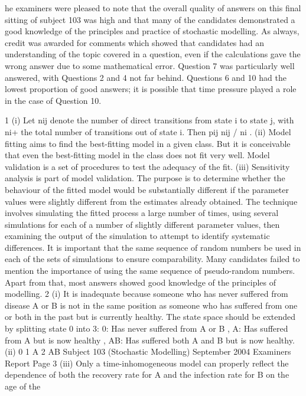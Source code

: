 \documentclass[a4paper,12pt]{article}
\begin{document}
\newpage
he examiners were pleased to note that the overall quality of answers on this
final sitting of subject 103 was high and that many of the candidates
demonstrated a good knowledge of the principles and practice of stochastic modelling. As always, credit was awarded for comments which showed that candidates had an understanding of the topic covered in a question, even if the
calculations gave the wrong answer due to some mathematical error.
Question 7 was particularly well answered, with Questions 2 and 4 not far
behind. Questions 6 and 10 had the lowest proportion of good answers; it is
possible that time pressure played a role in the case of Question 10.

1 (i) Let nij denote the number of direct transitions from state i to state j, with ni+
the total number of transitions out of state i. Then pij nij / ni .
(ii) Model fitting aims to find the best-fitting model in a given class. But it is
conceivable that even the best-fitting model in the class does not fit very well.
Model validation is a set of procedures to test the adequacy of the fit.
(iii) Sensitivity analysis is part of model validation. The purpose is to determine
whether the behaviour of the fitted model would be substantially different if
the parameter values were slightly different from the estimates already
obtained.
The technique involves simulating the fitted process a large number of times,
using several simulations for each of a number of slightly different parameter
values, then examining the output of the simulation to attempt to identify
systematic differences.
It is important that the same sequence of random numbers be used in each of
the sets of simulations to ensure comparability.
Many candidates failed to mention the importance of using the same sequence
of pseudo-random numbers. Apart from that, most answers showed good
knowledge of the principles of modelling.
2 (i) It is inadequate because someone who has never suffered from disease A or B
is not in the same position as someone who has suffered from one or both in
the past but is currently healthy.
The state space should be extended by splitting state 0 into 3: 0: Has never
suffered from A or B , A: Has suffered from A but is now healthy ,
AB: Has suffered both A and B but is now healthy.
(ii)
0
1
A
2
AB
Subject 103 (Stochastic Modelling) September 2004 Examiners Report
Page 3
(iii) Only a time-inhomogeneous model can properly reflect the dependence of
both the recovery rate for A and the infection rate for B on the age of the
\end{document}
